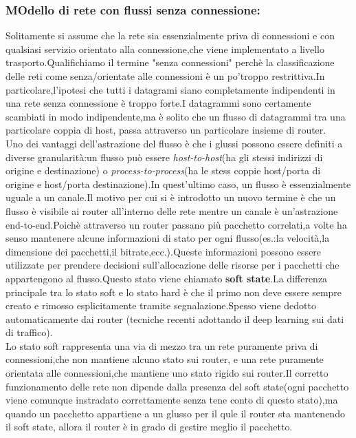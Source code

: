 \subsubsection{MOdello di rete con flussi senza connessione:}
Solitamente si assume che la rete sia essenzialmente priva di connessioni e con qualsiasi servizio orientato alla connessione,che viene implementato a livello trasporto.Qualifichiamo il termine "senza connessioni" perchè la classificazione delle reti come senza/orientate alle connessioni è un po'troppo restrittiva.In particolare,l'ipotesi che tutti i datagrami siano completamente indipendenti in una rete senza connessione è troppo forte.I datagrammi sono certamente scambiati in modo indipendente,ma è solito che un flusso di datagrammi tra una particolare coppia di host, passa attraverso un particolare insieme di router.\\
Uno dei vantaggi dell'astrazione del flusso è che i glussi possono essere definiti a diverse granularità:un flusso può essere \textit{host-to-host}(ha gli stessi indirizzi di origine e destinazione) o \textit{process-to-process}(ha le stess coppie host/porta di origine e host/porta destinazione).In quest'ultimo caso, un flusso è essenzialmente uguale a un canale.Il motivo per cui si è introdotto un nuovo termine è che un flusso è visibile ai router all'interno delle rete mentre un canale è un'astrazione end-to-end.Poichè attraverso un router passano più pacchetto correlati,a volte ha senso mantenere alcune informazioni di stato per ogni flusso(es.:la velocità,la dimensione dei pacchetti,il bitrate,ecc.).Queste informazioni possono essere utilizzate per prendere decisioni sull'allocazione delle risorse per i pacchetti che appartengono al flusso.Questo stato viene chiamato \textbf{soft state}.La differenza principale tra lo stato soft e lo stato hard è che il primo non deve essere sempre creato e rimosso esplicitamente tramite segnalazione.Spesso viene dedotto automaticamente dai router (tecniche recenti adottando il deep learning sui dati di traffico).\\
Lo stato soft rappresenta una via di mezzo tra un rete puramente priva di connessioni,che non mantiene alcuno stato sui router, e una rete puramente orientata alle connessioni,che mantiene uno stato rigido sui router.Il corretto funzionamento delle rete non dipende dalla presenza del soft state(ogni pacchetto viene comunque instradato correttamente senza tene conto di questo stato),ma  quando un pacchetto appartiene a un glusso per il qule il router sta mantenendo il soft state, allora il router è in grado di gestire meglio il pacchetto.\\
